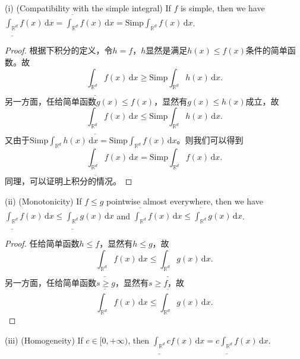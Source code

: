 \documentclass[reqno,a4paper,10pt]{amsart}
\newcommand\dif{\,\mathrm{d}}
\newcommand\Rnum{\mathbb{R}}
\begin{document}
(i) (Compatibility with the simple integral) If $f$ is simple, then we have $\underline{\int_{\Rnum^d}} f(x)\dif x =  \overline{\int_{\Rnum^d}} f(x)\dif x= \mathrm{Simp}\int_{\Rnum^d} f(x)\dif x$.
\begin{proof}
    根据下积分的定义，令$h=f$，$h$显然是满足$h(x)\leq f(x)$条件的简单函数。故
    \begin{equation*}
        \underline{\int_{\Rnum^d}} f(x)\dif x\geq \mathrm{Simp}\int_{\Rnum^d} h(x)\dif x.
    \end{equation*}
    另一方面，任给简单函数$g(x)\leq f(x)$，显然有$g(x)\leq h(x)$成立，故
    \begin{equation*}
        \underline{\int_{\Rnum^d}} f(x)\dif x\leq \mathrm{Simp}\int_{\Rnum^d} h(x)\dif x.
    \end{equation*}
    又由于$\mathrm{Simp}\int_{\Rnum^d} h(x)\dif x=\mathrm{Simp}\int_{\Rnum^d} f(x)\dif x$。则我们可以得到
    \begin{equation*}
        \underline{\int_{\Rnum^d}} f(x)\dif x=\mathrm{Simp}\int_{\Rnum^d} f(x)\dif x.
    \end{equation*}
    同理，可以证明上积分的情况。
\end{proof}
(ii) (Monotonicity) If $f\leq g$ pointwise almost everywhere, then we have $\underline{\int_{\Rnum^d}}f(x)\dif x\leq \underline{\int_{\Rnum^d}}g(x)\dif x$ and $\overline{\int_{\Rnum^d}}f(x)\dif x\leq \overline{\int_{\Rnum^d}}g(x)\dif x$.
\begin{proof}
    任给简单函数$h\leq f$，显然有$h\leq g$，故
    \begin{equation*}
        \underline{\int_{\Rnum^d}}f(x)\dif x\leq \underline{\int_{\Rnum^d}}g(x)\dif x.
    \end{equation*}
    另一方面，任给简单函数$s\geq g$，显然有$s\geq f$，故
    \begin{equation*}
        \overline{\int_{\Rnum^d}}f(x)\dif x\leq \overline{\int_{\Rnum^d}}g(x)\dif x.
    \end{equation*}
\end{proof}
(iii) (Homogeneity) If $c\in [0,+\infty)$, then $\underline{\int_{\Rnum^d}}cf(x)\dif x=c\underline{\int_{\Rnum^d}}f(x)\dif x$.
\end{document}
